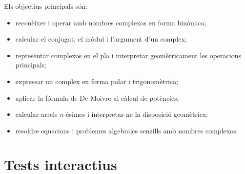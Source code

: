 \documentclass[12pt,a4paper,oneside]{book}
\begin{document}
Els objectius principals són:
\begin{itemize}
\item reconèixer i operar amb nombres complexos en forma binòmica;
\item calcular el conjugat, el mòdul i l'argument d'un complex;
\item representar complexos en el pla i interpretar geomètricament les operacions principals;
\item expressar un complex en forma polar i trigonomètrica;
\item aplicar la fórmula de De Moivre al càlcul de potències;
\item calcular arrels $n$-èsimes i interpretar-ne la disposició geomètrica;
\item resoldre equacions i problemes algebraics senzills amb nombres complexos.
\end{itemize}

\let\cleardoublepage\clearpage
\mainmatter




\chapter{Tests interactius}
\label{cap:tests}
\begin{Form}



\end{Form}

\backmatter
\end{document}
